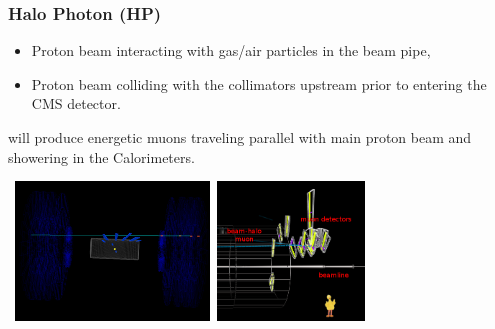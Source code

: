 \documentclass{beamer}
\begin{document}
\begin{frame}
\frametitle{Halo Photon (HP)}
 \begin{tcolorbox}[colback=UNL@Cream!5,colframe=UMN@Maroon!40,title=\textcolor{UMN@Maroon}{\textbf{Beam Halo Muons}}]
\begin{itemize}
 \item Proton beam interacting with gas/air particles in the beam pipe,
 \item Proton beam colliding with the collimators upstream prior to entering the CMS detector.
\end{itemize}
will produce energetic muons traveling parallel with main proton beam and showering in the Calorimeters.
\end{tcolorbox}
 \begin{minipage}[t]{0.8\linewidth}
  \mbox{
   \includegraphics[height=3.7cm,width=0.40\paperwidth]{THESISPLOTS/Beam_Halo-CandidateEvent24186728-Run122314.png}\quad
   \includegraphics[height=3.7cm,width=0.40\paperwidth]{THESISPLOTS/beam_halo_csc.png}
  }   
 \end{minipage}
\end{frame}
\end{document}
